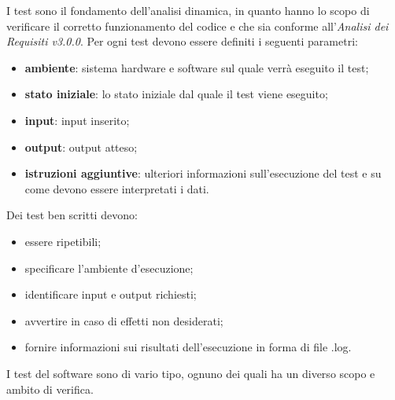 I test sono il fondamento dell'analisi dinamica, in quanto hanno lo scopo di verificare il corretto funzionamento del codice e che sia conforme all'\textit{Analisi dei Requisiti v3.0.0}.
Per ogni test devono essere definiti i seguenti parametri:
\begin{itemize}
    \item \textbf{ambiente}: sistema hardware e software sul quale verrà eseguito il test;
    \item \textbf{stato iniziale}: lo stato iniziale dal quale il test viene eseguito;
    \item \textbf{input}: input inserito;
    \item \textbf{output}: output atteso;
    \item \textbf{istruzioni aggiuntive}: ulteriori informazioni sull'esecuzione del test e su come devono essere interpretati i dati.
\end{itemize}
Dei test ben scritti devono:
\begin{itemize}
    \item essere ripetibili;
    \item specificare l'ambiente d'esecuzione;
    \item identificare input e output richiesti;
    \item avvertire in caso di effetti non desiderati;
    \item fornire informazioni sui risultati dell'esecuzione in forma di file {\selectfont .log}.
\end{itemize}
I test del software sono di vario tipo, ognuno dei quali ha un diverso scopo e ambito di verifica.
